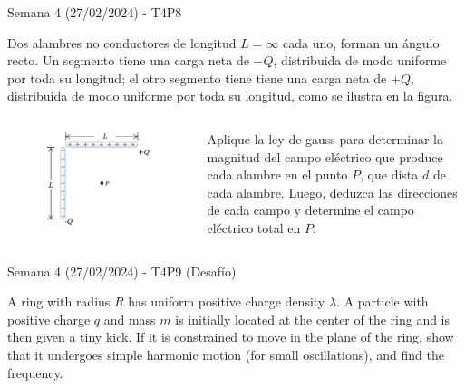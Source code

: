 \begin{frame}{Semana 4 (27/02/2024) - T4P8}
  
  Dos alambres no conductores de longitud $L=\infty$ cada uno, forman un ángulo recto. Un segmento tiene una carga neta de $-Q$, distribuida de modo uniforme por toda su longitud; el otro segmento tiene tiene una carga neta de $+Q$, distribuida de modo uniforme por toda su longitud, como se ilustra en la figura.
    
    \begin{columns}
    
    
    \begin{figure}
        \centering
        \includegraphics[scale=0.25]{figures/t4p8.png}
    \end{figure}
    
    
    Aplique la ley de gauss para determinar la magnitud del campo el\'ectrico que produce cada alambre en el punto $P$, que dista $d$ de cada alambre. Luego, deduzca las direcciones de cada campo y determine el campo el\'ectrico total en $P$.
    
    \end{columns}
    
\end{frame}

\begin{frame}{Semana 4 (27/02/2024) - T4P9 (Desafío)}
  
  A ring with radius $R$ has uniform positive charge density $\lambda$. A particle with positive charge $q$ and mass $m$ is initially located at the center of the ring and is then given a tiny kick. If it is constrained to move in the plane of the ring, show that it undergoes simple harmonic motion (for small oscillations), and find the frequency.
    
\end{frame}

